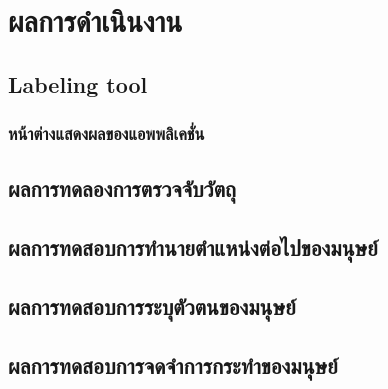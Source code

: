 \chapter{ผลการดำเนินงาน}
\section{Labeling tool}
\subsection{หน้าต่างแสดงผลของแอพพลิเคชั่น}


\clearpage
\section{ผลการทดลองการตรวจจับวัตถุ}

\clearpage
\section{ผลการทดสอบการทำนายตำแหน่งต่อไปของมนุษย์}


\section{ผลการทดสอบการระบุตัวตนของมนุษย์}
%

\section{ผลการทดสอบการจดจำการกระทำของมนุษย์}


%

%